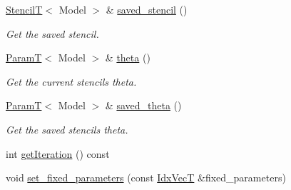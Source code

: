 \begin{DoxyCompactItemize}
\hyperlink{namespacemappel_a3a06598240007876f8c4bf834ad86197}{StencilT}$<$ Model $>$ \& \hyperlink{classmappel_1_1IterativeMaximizer_1_1MaximizerData_ac98f83e1362c3edd65e0681ee93c6da0}{saved\+\_\+stencil} ()
\begin{DoxyCompactList}\small\item\em Get the saved stencil. \end{DoxyCompactList}\item 
\hyperlink{namespacemappel_a667925cb0d6c0e49f2f035cc5a9a6857}{ParamT}$<$ Model $>$ \& \hyperlink{classmappel_1_1IterativeMaximizer_1_1MaximizerData_ac6ed5231a1ac2f4bfdd51a2800212fea}{theta} ()
\begin{DoxyCompactList}\small\item\em Get the current stencil\textquotesingle{}s theta. \end{DoxyCompactList}\item 
\hyperlink{namespacemappel_a667925cb0d6c0e49f2f035cc5a9a6857}{ParamT}$<$ Model $>$ \& \hyperlink{classmappel_1_1IterativeMaximizer_1_1MaximizerData_aedc8670533fe0323a62e7def637875db}{saved\+\_\+theta} ()
\begin{DoxyCompactList}\small\item\em Get the saved stencil\textquotesingle{}s theta. \end{DoxyCompactList}\item 
int \hyperlink{classmappel_1_1IterativeMaximizer_1_1MaximizerData_ab4248a81292964ea9cbfd37964a7b2c1}{get\+Iteration} () const 
\item 
void \hyperlink{classmappel_1_1IterativeMaximizer_1_1MaximizerData_aeff700342cb52da0b5b0d8edb3dac020}{set\+\_\+fixed\+\_\+parameters} (const \hyperlink{namespacemappel_ac63743dcd42180127307cd0e4ecdd784}{Idx\+VecT} \&fixed\+\_\+parameters)
\end{DoxyCompactItemize}
